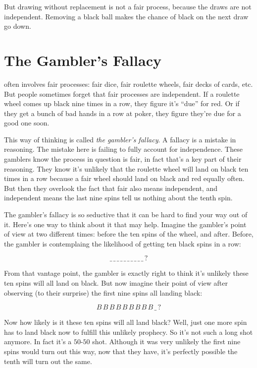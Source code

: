 \documentclass[justified]{tufte-book}
\theoremstyle{definition}
\theoremstyle{definition}
\theoremstyle{definition}
\theoremstyle{remark}
\begin{document}
But drawing without replacement is not a fair process, because the draws are not independent. Removing a black ball makes the chance of black on the next draw go down.

\hypertarget{the-gamblers-fallacy-1}{%
\section{The Gambler's Fallacy}\label{the-gamblers-fallacy-1}}

 often involves fair processes: fair dice, fair roulette wheels, fair decks of cards, etc. But people sometimes forget that fair processes are independent. If a roulette wheel comes up black nine times in a row, they figure it's ``due'' for red. Or if they get a bunch of bad hands in a row at poker, they figure they're due for a good one soon.

This way of thinking is called \emph{the gambler's fallacy}. A fallacy is a mistake in reasoning. The mistake here is failing to fully account for independence. These gamblers know the process in question is fair, in fact that's a key part of their reasoning. They know it's unlikely that the roulette wheel will land on black ten times in a row because a fair wheel should land on black and red equally often. But then they overlook the fact that fair also means independent, and independent means the last nine spins tell us nothing about the tenth spin.

The gambler's fallacy is so seductive that it can be hard to find your way out of it. Here's one way to think about it that may help. Imagine the gambler's point of view at two different times: before the ten spins of the wheel, and after. Before, the gambler is contemplaing the likelihood of getting ten black spins in a row:

\[  \_ \, \_ \,\_ \,\_ \,\_ \,\_ \,\_ \,\_ \,\_ \,\_ \, ? \]

From that vantage point, the gambler is exactly right to think it's unlikely these ten spins will all land on black. But now imagine their point of view after observing (to their surprise) the first nine spins all landing black:

\[ B \, B \, B \, B \, B \, B \, B \, B \, B  \, \_ \,? \]

Now how likely is it these ten spins will all land black? Well, just one more spin has to land black now to fulfill this unlikely prophecy. So it's not such a long shot anymore. In fact it's a \(50\)-\(50\) shot. Although it was very unlikely the first nine spins would turn out this way, now that they have, it's perfectly possible the tenth will turn out the same.
\end{document}

